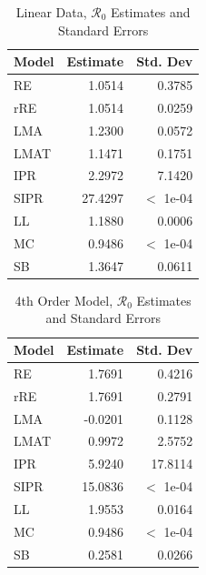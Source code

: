 \documentclass[12pt]{article}
\newcommand{\rr}{\ensuremath{\mathcal{R}_0}}
\begin{document}
\begin{table}[H]
	
	\centering
	\begin{tabular}[t]{l|r|r}
		\hline
		Model & Estimate & Std. Dev\\
		\hline
		RE & 1.0514 & 0.3785\\
		\hline
		rRE & 1.0514 & 0.0259\\
		\hline
		LMA & 1.2300 & 0.0572\\
		\hline
		LMAT & 1.1471 & 0.1751\\
		\hline
		IPR & 2.2972 & 7.1420\\
		\hline
		SIPR & 27.4297 & $<$ 1e-04\\
		\hline
		LL & 1.1880 & 0.0006\\
		\hline
		MC & 0.9486 & $<$ 1e-04\\
		\hline
		SB & 1.3647 & 0.0611\\
		\hline
	\end{tabular}
	\caption{Linear Data, $\rr$ Estimates and Standard Errors}
\end{table}

\begin{table}[H]
	
	
	\centering
	\begin{tabular}[t]{l|r|r}
		\hline
		Model & Estimate & Std. Dev\\
		\hline
		RE & 1.7691 & 0.4216\\
		\hline
		rRE & 1.7691 & 0.2791\\
		\hline
		LMA & -0.0201 & 0.1128\\
		\hline
		LMAT & 0.9972 & 2.5752\\
		\hline
		IPR & 5.9240 & 17.8114\\
		\hline
		SIPR & 15.0836 & $<$ 1e-04\\
		\hline
		LL & 1.9553 & 0.0164\\
		\hline
		MC & 0.9486 & $<$ 1e-04\\
		\hline
		SB & 0.2581 & 0.0266\\
		\hline
	\end{tabular}
	\caption{4th Order Model, $\rr$ Estimates and Standard Errors}
\end{table}
\end{document}
